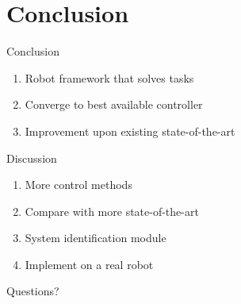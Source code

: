 \section{Conclusion}

\begin{frame}[fragile]{Conclusion}
  \begin{block}{}
  \begin{enumerate}
    \item Robot framework that solves tasks\pause
    \item Converge to best available controller\pause
    \item Improvement upon existing state-of-the-art
  \end{enumerate}
  \end{block}
\end{frame}

\begin{frame}[fragile]{Discussion}
  \begin{block}{}
  \begin{enumerate}
    \item More control methods\pause
    \item Compare with more state-of-the-art\pause
    \item System identification module\pause
    \item Implement on a real robot
  \end{enumerate}
  \end{block}
\end{frame}

\begin{frame}[fragile]{}
\begin{center}
    Questions?
\end{center}
\end{frame}
